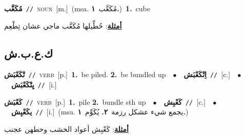 \documentclass[10pt,a4paper,twoside]{article} %
\begin{document}
\begin{multicols}{2}
{\setlength\topsep{0pt}\textbf{\foreignlanguage{arabic}{مُكَعَّب}}\ {\color{gray}\texttt{//}\color{black}}\ \textsc{noun}\ [m.]\ \color{gray}(msa. \foreignlanguage{arabic}{مُكَعَّب}~\foreignlanguage{arabic}{\textbf{١.}})\color{black}\ \textbf{1.}~cube\  \begin{flushright}\color{gray}\foreignlanguage{arabic}{\textbf{\underline{\foreignlanguage{arabic}{أمثلة}}}: حُطِّيلها مُكَعَّب ماجي عشان تِطْعِم}\end{flushright}\color{black}} \vspace{2mm}

\vspace{-3mm}
\subsection*{\color{blue}\foreignlanguage{arabic}{ك.ع.ب.ش}\color{blue}{}} 

{\setlength\topsep{0pt}\textbf{\foreignlanguage{arabic}{تْكَعْبَش}}\ {\color{gray}\texttt{//}\color{black}}\ \textsc{verb}\ [p.]\ \textbf{1.}~be piled.  \textbf{2.}~be bundled up\ \ $\bullet$\ \ \setlength\topsep{0pt}\textbf{\foreignlanguage{arabic}{اِتْكَعْبَش}}\ {\color{gray}\texttt{//}\color{black}}\ [c.]\ \ $\bullet$\ \ \setlength\topsep{0pt}\textbf{\foreignlanguage{arabic}{يِتْكَعْبَش}}\ {\color{gray}\texttt{//}\color{black}}\ [i.]\ } \vspace{2mm}

{\setlength\topsep{0pt}\textbf{\foreignlanguage{arabic}{كَعْبَش}}\ {\color{gray}\texttt{//}\color{black}}\ \textsc{verb}\ [p.]\ \textbf{1.}~pile  \textbf{2.}~bundle sth up\ \ $\bullet$\ \ \setlength\topsep{0pt}\textbf{\foreignlanguage{arabic}{كَعْبِش}}\ {\color{gray}\texttt{//}\color{black}}\ [c.]\ \ $\bullet$\ \ \setlength\topsep{0pt}\textbf{\foreignlanguage{arabic}{يكَعْبِش}}\ {\color{gray}\texttt{//}\color{black}}\ [i.]\ \color{gray}(msa. \foreignlanguage{arabic}{يجمع شيء عشكل رزمة}~\foreignlanguage{arabic}{\textbf{٢.}}  \foreignlanguage{arabic}{يُكَوِّم}~\foreignlanguage{arabic}{\textbf{١.}})\color{black}\  \begin{flushright}\color{gray}\foreignlanguage{arabic}{\textbf{\underline{\foreignlanguage{arabic}{أمثلة}}}: كَعْبِش أعواد الخشب وحطهن عجنب}\end{flushright}\color{black}} \vspace{2mm}


\end{multicols}
\end{document}
